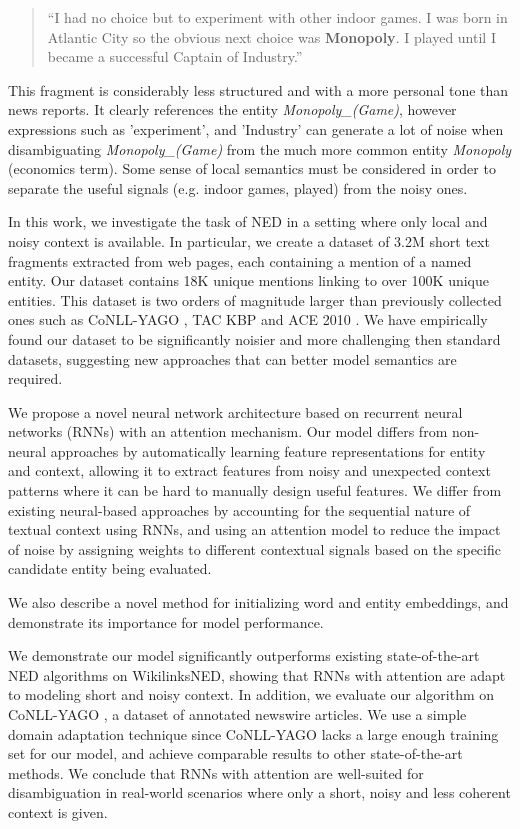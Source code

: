 \documentclass[11pt]{article}
\begin{document}
	\begin{quote}
		``I had no choice but to experiment with other indoor games. I was born in Atlantic City so the obvious next choice was \textbf{Monopoly}. I played until I became a successful Captain of Industry.''
	\end{quote}
	
	This fragment is considerably less structured and with a more personal tone than news reports. It clearly references the entity \textit{Monopoly\_(Game)}, however expressions such as 'experiment', and 'Industry' can generate a lot of noise when disambiguating \textit{Monopoly\_(Game)} from the much more common entity \textit{Monopoly} (economics term). Some sense of local semantics must be considered in order to separate the useful signals (e.g. indoor games, played) from the noisy ones.
	
	In this work, we investigate the task of NED in a setting where only local and noisy context is available. In particular, we create a dataset of 3.2M short text fragments extracted from web pages, each containing a mention of a named entity. Our dataset contains 18K unique mentions linking to over 100K unique entities. This dataset is two orders of magnitude larger than previously collected ones such as CoNLL-YAGO \cite{hoffart2011robust}, TAC KBP \cite{ji2010overview} and ACE 2010 \cite{bentivogli2010extending}. We have empirically found our dataset to be significantly noisier and more challenging then standard datasets, suggesting new approaches that can better model semantics are required.
	
	We propose a novel neural network architecture based on recurrent neural networks (RNNs) with an attention mechanism. Our model differs from non-neural approaches by automatically learning feature representations for entity and context, allowing it to extract features from noisy and unexpected context patterns where it can be hard to manually design useful features. We differ from existing neural-based approaches by accounting for the sequential nature of textual context using RNNs, and using an attention model to reduce the impact of noise by assigning weights to different contextual signals based on the specific candidate entity being evaluated.
	
	We also describe a novel method for initializing word and entity embeddings, and demonstrate its importance for model performance. 
	
	We demonstrate our model significantly outperforms existing state-of-the-art NED algorithms on WikilinksNED, showing that RNNs with attention are adapt to modeling short and noisy context. In addition, we evaluate our algorithm on CoNLL-YAGO \cite{hoffart2011robust}, a dataset of annotated newswire articles. We use a simple domain adaptation technique since CoNLL-YAGO lacks a large enough training set for our model, and achieve comparable results to other state-of-the-art methods. We conclude that RNNs with attention are well-suited for disambiguation in real-world scenarios where only a short, noisy and less coherent context is given.
	
\end{document}
